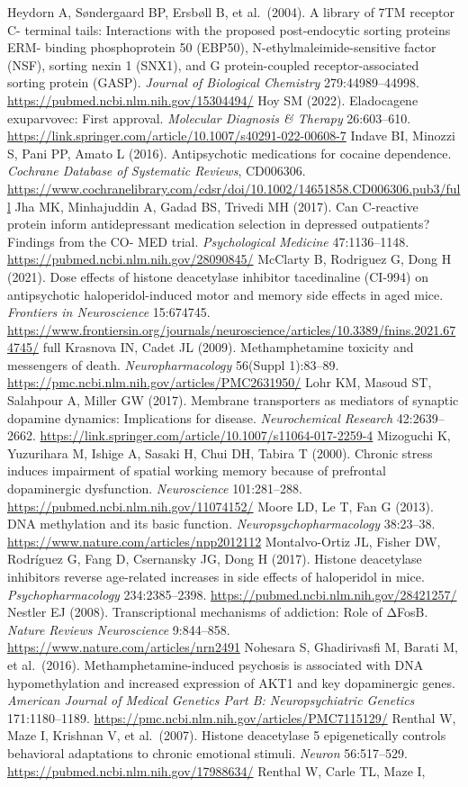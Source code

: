 Heydorn A, Søndergaard BP, Ersbøll B, et al.~(2004). A library of 7TM receptor C- terminal tails: Interactions with the proposed post-endocytic sorting proteins ERM- binding phosphoprotein 50 (EBP50), N-ethylmaleimide-sensitive factor (NSF), sorting nexin 1 (SNX1), and G protein-coupled receptor-associated sorting protein (GASP). \emph{Journal of Biological Chemistry} 279:44989--44998. \url{https://pubmed.ncbi.nlm.nih.gov/15304494/} Hoy SM (2022). Eladocagene exuparvovec: First approval. \emph{Molecular Diagnosis \& Therapy} 26:603--610. \url{https://link.springer.com/article/10.1007/s40291-022-00608-7} Indave BI, Minozzi S, Pani PP, Amato L (2016). Antipsychotic medications for cocaine dependence. \emph{Cochrane Database of Systematic Reviews}, CD006306. \url{https://www.cochranelibrary.com/cdsr/doi/10.1002/14651858.CD006306.pub3/full} Jha MK, Minhajuddin A, Gadad BS, Trivedi MH (2017). Can C-reactive protein inform antidepressant medication selection in depressed outpatients? Findings from the CO- MED trial. \emph{Psychological Medicine} 47:1136--1148. \url{https://pubmed.ncbi.nlm.nih.gov/28090845/} McClarty B, Rodriguez G, Dong H (2021). Dose effects of histone deacetylase inhibitor tacedinaline (CI-994) on antipsychotic haloperidol-induced motor and memory side effects in aged mice. \emph{Frontiers in Neuroscience} 15:674745. \url{https://www.frontiersin.org/journals/neuroscience/articles/10.3389/fnins.2021.674745/} full Krasnova IN, Cadet JL (2009). Methamphetamine toxicity and messengers of death. \emph{Neuropharmacology} 56(Suppl 1):83--89. \url{https://pmc.ncbi.nlm.nih.gov/articles/PMC2631950/} Lohr KM, Masoud ST, Salahpour A, Miller GW (2017). Membrane transporters as mediators of synaptic dopamine dynamics: Implications for disease. \emph{Neurochemical Research} 42:2639--2662. \url{https://link.springer.com/article/10.1007/s11064-017-2259-4} Mizoguchi K, Yuzurihara M, Ishige A, Sasaki H, Chui DH, Tabira T (2000). Chronic stress induces impairment of spatial working memory because of prefrontal dopaminergic dysfunction. \emph{Neuroscience} 101:281--288. \url{https://pubmed.ncbi.nlm.nih.gov/11074152/} Moore LD, Le T, Fan G (2013). DNA methylation and its basic function. \emph{Neuropsychopharmacology} 38:23--38. \url{https://www.nature.com/articles/npp2012112} Montalvo-Ortiz JL, Fisher DW, Rodríguez G, Fang D, Csernansky JG, Dong H (2017). Histone deacetylase inhibitors reverse age-related increases in side effects of haloperidol in mice. \emph{Psychopharmacology} 234:2385--2398. \url{https://pubmed.ncbi.nlm.nih.gov/28421257/} Nestler EJ (2008). Transcriptional mechanisms of addiction: Role of ΔFosB. \emph{Nature Reviews Neuroscience} 9:844--858. \url{https://www.nature.com/articles/nrn2491} Nohesara S, Ghadirivasfi M, Barati M, et al.~(2016). Methamphetamine-induced psychosis is associated with DNA hypomethylation and increased expression of AKT1 and key dopaminergic genes. \emph{American Journal of Medical Genetics Part B: Neuropsychiatric Genetics} 171:1180--1189. \url{https://pmc.ncbi.nlm.nih.gov/articles/PMC7115129/} Renthal W, Maze I, Krishnan V, et al.~(2007). Histone deacetylase 5 epigenetically controls behavioral adaptations to chronic emotional stimuli. \emph{Neuron} 56:517--529. \url{https://pubmed.ncbi.nlm.nih.gov/17988634/} Renthal W, Carle TL, Maze I, 